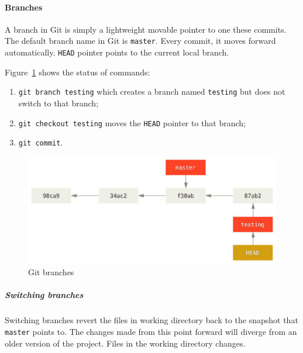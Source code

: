 \paragraph{Branches}
A branch in Git is simply a lightweight movable pointer to one these commits. The default branch name in Git is \texttt{master}. Every commit, it moves forward automatically. \texttt{HEAD} pointer points to the current local branch.

Figure~\ref{img:git_branches} shows the status of commands:
\begin{enumerate}
\item \texttt{git branch testing} which creates a branch named \texttt{testing} but does not switch to that branch;
\item \texttt{git checkout testing} moves the \texttt{HEAD} pointer to that branch;
\item \texttt{git commit}.
\end{enumerate}

\begin{figure}[hbtp]
\centering
\includegraphics[scale=0.4]{images/git_branches.png}
\caption{Git branches}
\label{img:git_branches}
\end{figure}

\subparagraph{Switching branches}
Switching branches revert the files in working directory back to the snapshot that \texttt{master} points to. The changes made from this point forward will diverge from an older version of the project. Files in the working directory changes.

